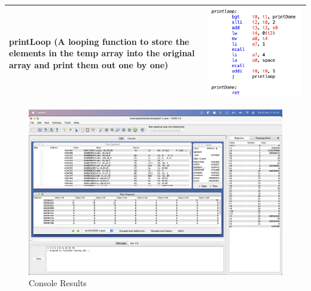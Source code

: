 \documentclass[10pt,a4paper]{article}
\begin{document}
\begin{ans}
\begin{table}[htbp]
\begin{center}
\begin{tabular}[H]{|M{3cm}|M{12cm}|}
					\hline
					printLoop (A looping function to store the elements in the temp array into the original array and print them out one by one)
					& \includegraphics[scale = 0.7]{Lab1-2-3.png}\\
					\hline
				\end{tabular}
		\end{center}
        
    \end{table}
    \break
	\begin{figure}[H]
		\caption{Console Results}
		\includegraphics[width=1\linewidth]{Lab1-2-1.png}
	\end{figure}
    
\end{ans}
\end{document}
